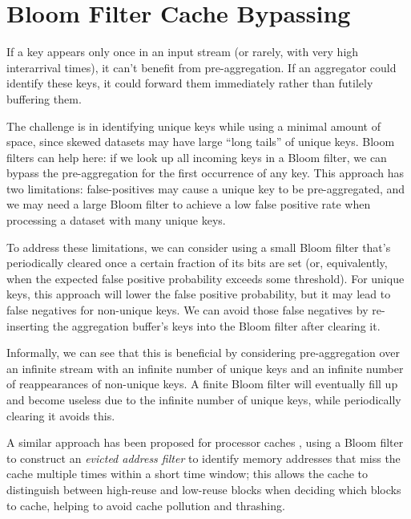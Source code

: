 \documentclass[twocolumn, 10pt]{article}
\begin{document}
\section{Bloom Filter Cache Bypassing}

If a key appears only once in an input stream (or rarely, with very high
interarrival times), it can't benefit from pre-aggregation.  If an aggregator
could identify these keys, it could forward them immediately rather than
futilely buffering them. 

The challenge is in identifying unique keys while using a minimal amount of
space, since skewed datasets may have large ``long tails'' of unique keys.
Bloom filters can help here: if we look up all incoming keys in
a Bloom filter, we can bypass the pre-aggregation for the first occurrence of
any key.  This approach has two limitations: false-positives may cause
a unique key to be pre-aggregated, and we may need a large Bloom filter to
achieve a low false positive rate when processing a dataset with many unique
keys.

To address these limitations, we can consider using a small Bloom filter that's
periodically cleared once a certain fraction of its bits are set (or,
equivalently, when the expected false positive probability exceeds some
threshold).  For unique keys, this approach will lower the false positive
probability, but it may lead to false negatives for non-unique keys.
We can avoid those false negatives by re-inserting the aggregation buffer's
keys into the Bloom filter after clearing it.

Informally, we can see that this is beneficial by considering pre-aggregation
over an infinite stream with an infinite number of unique keys and an infinite
number of reappearances of non-unique keys.  A finite Bloom filter will
eventually fill up and become useless due to the infinite number of unique
keys, while periodically clearing it avoids this.

A similar approach has been proposed for processor caches
\cite{evicted-address-filter}, using a Bloom filter to construct an
\emph{evicted address filter} to identify memory addresses that miss the cache
multiple times within a short time window; this allows the cache to
distinguish between high-reuse and low-reuse blocks when deciding which blocks
to cache, helping to avoid cache pollution and thrashing.

\end{document}
